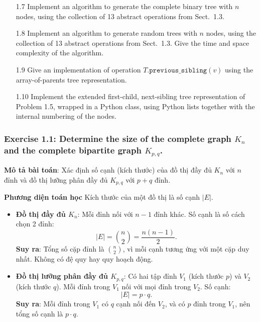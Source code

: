 \documentclass[a4paper,12pt]{article}
\begin{document}
\begin{enumerate}
    \item[1.7] Implement an algorithm to generate the complete binary tree with $n$ nodes, using the collection of 13 abstract operations from Sect.~1.3.
    
    \item[1.8] Implement an algorithm to generate random trees with $n$ nodes, using the collection of 13 abstract operations from Sect.~1.3. Give the time and space complexity of the algorithm.
    
    \item[1.9] Give an implementation of operation $T.\texttt{previous\_sibling}(v)$ using the array-of-parents tree representation.
    
    \item[1.10] Implement the extended first-child, next-sibling tree representation of Problem 1.5, wrapped in a Python class, using Python lists together with the internal numbering of the nodes.
\end{enumerate}

\subsubsection{Exercise 1.1: Determine the size of the complete graph $K_n$ and the complete bipartite graph $K_{p,q}$.}
\textbf{Mô tả bài toán}: Xác định số cạnh (kích thước) của đồ thị đầy đủ \( K_n \) với \( n \) đỉnh và đồ thị lưỡng phân đầy đủ \( K_{p,q} \) với \( p + q \) đỉnh.

\textbf{Phương diện toán học}
Kích thước của một đồ thị là số cạnh \( |E| \).

\begin{itemize}
    \item \textbf{Đồ thị đầy đủ \( K_n \)}: Mỗi đỉnh nối với \( n-1 \) đỉnh khác. Số cạnh là số cách chọn 2 đỉnh:
    \[
    |E| = \binom{n}{2} = \frac{n(n-1)}{2}.
    \]
    \textbf{Suy ra}: Tổng số cặp đỉnh là \( \binom{n}{2} \), vì mỗi cạnh tương ứng với một cặp duy nhất. Không có đệ quy hay quy hoạch động.
    \item \textbf{Đồ thị lưỡng phân đầy đủ \( K_{p,q} \)}: Có hai tập đỉnh \( V_1 \) (kích thước \( p \)) và \( V_2 \) (kích thước \( q \)). Mỗi đỉnh trong \( V_1 \) nối với mọi đỉnh trong \( V_2 \). Số cạnh:
    \[
    |E| = p \cdot q.
    \]
    \textbf{Suy ra}: Mỗi đỉnh trong \( V_1 \) có \( q \) cạnh nối đến \( V_2 \), và có \( p \) đỉnh trong \( V_1 \), nên tổng số cạnh là \( p \cdot q \).
\end{itemize}
\end{document}
